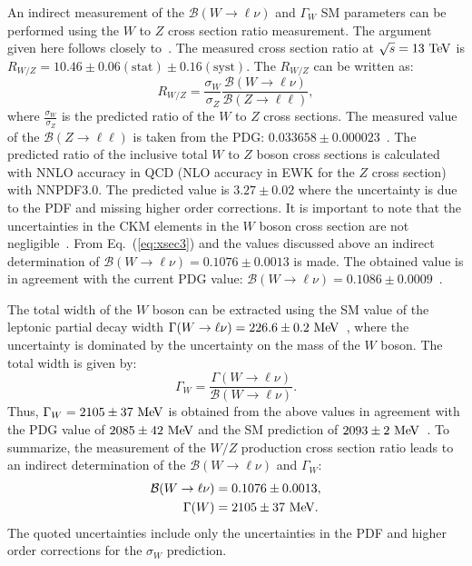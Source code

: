 An indirect measurement of the $\mathcal{B}(W \rightarrow \ell \nu)$  and $\Gamma_W$ SM parameters can be performed using the $W$ to $Z$ cross section ratio measurement. The argument given here follows closely to~\cite{CMS:2011aa}. The measured cross section ratio at $\sqrt{s}=13~\mathrm{Te\kern -0.1em V}$ is $R_{W/Z}=10.46 \pm 0.06 (\mathrm{stat}) \pm 0.16(\mathrm{syst})$. The $R_{W/Z}$ can be written as:
\begin{equation} \label{eq:xsec3}
R_{W/Z} = \frac{\sigma_W}{\sigma_Z} \frac{\mathcal{B}(W\rightarrow \ell\nu)}{\mathcal{B}(Z\rightarrow \ell\ell)},
\end{equation}
where $\frac{\sigma_W}{\sigma_Z}$ is the predicted ratio of the $W$ to $Z$ cross sections. The measured value of the  $\mathcal{B}(Z\rightarrow \ell\ell)$ is taken from the PDG: $0.033658 \pm 0.000023$~\cite{Agashe:2014kda}. The predicted ratio of the inclusive total $W$ to $Z$ boson cross sections is calculated with NNLO accuracy in QCD (NLO accuracy in EWK for the $Z$ cross section) with NNPDF3.0. The predicted value is $3.27\pm0.02$ where the uncertainty is due to the PDF and missing higher order corrections. It is important to note that the uncertainties in the CKM elements in the $W$ boson cross section are not negligible~\cite{Renton:2008ub}. From Eq.~(\ref{eq:xsec3}) and the values discussed above an indirect determination of  $\mathcal{B}(W \rightarrow \ell \nu) = 0.1076 \pm 0.0013$ is made. The obtained value is in agreement with the current PDG value: $\mathcal{B}(W \rightarrow \ell \nu) = 0.1086 \pm 0.0009$~\cite{Agashe:2014kda}. 

The total width of the $W$ boson can be extracted using the SM value of the leptonic partial decay width $\Gamma(W \rightarrow \ell \nu)=226.6 \pm 0.2~\mathrm{Me\kern -0.1em V}$~\cite{Rosner:1993rj,Renton:2008ub}, where the uncertainty is dominated by the uncertainty on the mass of the $W$ boson. The total width is given by:
\begin{equation} \label{eq:xsec4}
\Gamma_W = \frac{\Gamma(W \rightarrow \ell \nu)}{\mathcal{B}(W \rightarrow \ell \nu) }.
\end{equation}
Thus, $\Gamma_W = 2105 \pm 37~\mathrm{Me\kern -0.1em V}$ is obtained from the above values in agreement with the PDG value of $2085 \pm 42~\mathrm{Me\kern -0.1em V}$ and the SM prediction of $2093 \pm 2~\mathrm{Me\kern -0.1em V}$~\cite{Renton:2008ub}. To summarize, the measurement of the $W/Z$ production cross section ratio leads to an indirect determination of the $\mathcal{B}(W\rightarrow \ell\nu)$  and $\Gamma_W$:
\begin{eqnarray} \label{eq:xsecm}
\begin{aligned}
\mathcal{B}(W\rightarrow \ell\nu) &= 0.1076 \pm 0.0013, \\
\Gamma(W) &= 2105 \pm 37~\mathrm{Me\kern -0.1em V}.
\end{aligned}
\end{eqnarray}
The quoted uncertainties include only the uncertainties in the PDF and higher order corrections for the $\sigma_W$ prediction. 
 

